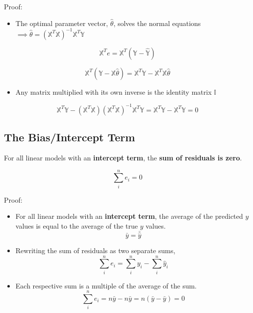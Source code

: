 \documentclass[
  letterpaper,
  DIV=11,
  numbers=noendperiod]{scrreprt}
\providecommand{\tightlist}{%
  \setlength{\itemsep}{0pt}\setlength{\parskip}{0pt}}\usepackage{longtable,booktabs,array}
\begin{document}
\begin{tcolorbox}[enhanced jigsaw, leftrule=.75mm, breakable, colframe=quarto-callout-color-frame, colback=white, left=2mm, rightrule=.15mm, arc=.35mm, bottomrule=.15mm, opacityback=0, toprule=.15mm]

Proof:

\begin{itemize}
\tightlist
\item
  The optimal parameter vector, \(\hat{\theta}\), solves the normal
  equations
  \(\implies \hat{\theta} = (\mathbb{X}^T\mathbb{X})^{-1}\mathbb{X}^T\mathbb{Y}\)
\end{itemize}

\[\mathbb{X}^Te = \mathbb{X}^T (\mathbb{Y} - \mathbb{\hat{Y}}) \]

\[\mathbb{X}^T (\mathbb{Y} - \mathbb{X}\hat{\theta}) = \mathbb{X}^T\mathbb{Y} - \mathbb{X}^T\mathbb{X}\hat{\theta}\]

\begin{itemize}
\tightlist
\item
  Any matrix multiplied with its own inverse is the identity matrix
  \(\mathbb{I}\)
\end{itemize}

\[\mathbb{X}^T\mathbb{Y} - (\mathbb{X}^T\mathbb{X})(\mathbb{X}^T\mathbb{X})^{-1}\mathbb{X}^T\mathbb{Y} = \mathbb{X}^T\mathbb{Y} - \mathbb{X}^T\mathbb{Y} = 0\]

\end{tcolorbox}

\subsection{The Bias/Intercept Term}\label{the-biasintercept-term}

For all linear models with an \textbf{intercept term}, the \textbf{sum
of residuals is zero}.

\[\sum_i^n e_i = 0\]

\begin{tcolorbox}[enhanced jigsaw, leftrule=.75mm, breakable, colframe=quarto-callout-color-frame, colback=white, left=2mm, rightrule=.15mm, arc=.35mm, bottomrule=.15mm, opacityback=0, toprule=.15mm]

Proof:

\begin{itemize}
\tightlist
\item
  For all linear models with an \textbf{intercept term}, the average of
  the predicted \(y\) values is equal to the average of the true \(y\)
  values. \[\bar{y} = \bar{\hat{y}}\]
\item
  Rewriting the sum of residuals as two separate sums,
  \[\sum_i^n e_i = \sum_i^n y_i - \sum_i^n\hat{y}_i\]
\item
  Each respective sum is a multiple of the average of the sum.
  \[\sum_i^n e_i = n\bar{y} - n\bar{y} = n(\bar{y} - \bar{y}) = 0\]
\end{itemize}

\end{tcolorbox}
\end{document}

